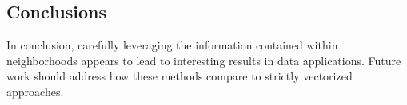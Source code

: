 \documentclass[a0,landscape]{a0poster}
\begin{document}
\begin{multicols}{3}
\large{\section*{\color{uwred}Conclusions}}
\hspace{1cm}In conclusion, carefully leveraging the information contained within neighborhoods appears to lead to interesting results in data applications. Future work should address how these methods compare to strictly vectorized approaches.
\end{multicols}
\end{document}
